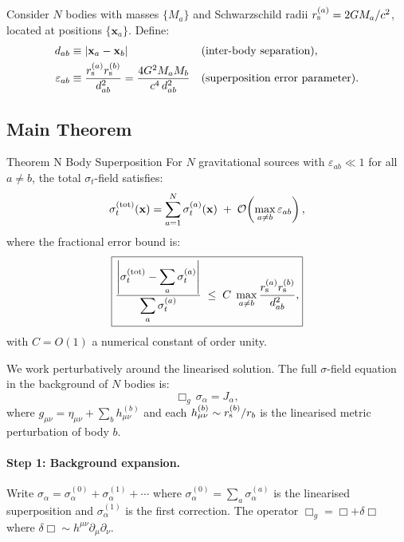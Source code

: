 \documentclass[11pt,a4paper]{article}
\theoremstyle{definition}
\theoremstyle{remark}
\newcommand{\rs}[1]{r_{\rm s}^{(#1)}}
\newcommand{\sig}[2]{\sigma_{#1}^{(#2)}}
\newcommand{\boldx}{\mathbf{x}}
\begin{document}
	Consider $N$ bodies with masses $\{M_a\}$ and Schwarzschild radii
	$\rs{a}=2GM_a/c^2$, located at positions $\{\boldx_a\}$.  Define:
	\begin{align}
		d_{ab} &\equiv |\boldx_a-\boldx_b| & &\text{(inter-body separation)},\\
		\varepsilon_{ab} &\equiv \frac{\rs{a}\rs{b}}{d_{ab}^2}
		= \frac{4G^2M_aM_b}{c^4\,d_{ab}^2} & &\text{(superposition error parameter)}.
		\label{eq:epsilon_def}
	\end{align}
	
	\subsection{Main Theorem}
	
	Theorem N Body Superposition
		For $N$ gravitational sources with $\varepsilon_{ab}\ll1$ for all
		$a\neq b$, the total $\sigma_t$-field satisfies:
		\begin{equation}
			\sigma_t^{(\rm tot)}(\boldx)
			= \sum_{a=1}^N \sig{t}{a}(\boldx)
			\;+\;
			\mathcal{O}\!\left(\max_{a\neq b}\varepsilon_{ab}\right),
			\label{eq:superposition_theorem}
		\end{equation}
		where the fractional error bound is:
		\begin{equation}
			\boxed{
				\frac{\left|\sigma_t^{(\rm tot)}
					-\displaystyle\sum_a\sig{t}{a}\right|}
				{\displaystyle\sum_a\sig{t}{a}}
				\;\leq\;
				C\;\max_{a\neq b}\frac{\rs{a}\rs{b}}{d_{ab}^2},
			}
			\label{eq:error_bound}
		\end{equation}
		with $C=O(1)$ a numerical constant of order unity.

		We work perturbatively around the linearised solution.  The full
		$\sigma$-field equation in the background of $N$ bodies is:
		\begin{equation}
			\Box_{g}\,\sigma_\alpha = J_\alpha,
		\end{equation}
		where $g_{\mu\nu}=\eta_{\mu\nu}+\sum_b h_{\mu\nu}^{(b)}$ and each
		$h_{\mu\nu}^{(b)}\sim\rs{b}/r_b$ is the linearised metric perturbation
		of body $b$.
		
		\paragraph{Step 1: Background expansion.}
		Write $\sigma_\alpha=\sigma_\alpha^{(0)}+\sigma_\alpha^{(1)}+\cdots$
		where $\sigma_\alpha^{(0)}=\sum_a\sig{\alpha}{a}$ is the linearised
		superposition and $\sigma_\alpha^{(1)}$ is the first correction.
		The operator $\Box_g=\Box+\delta\Box$ where
		$\delta\Box\sim h^{\mu\nu}\partial_\mu\partial_\nu$.
		
\end{document}
